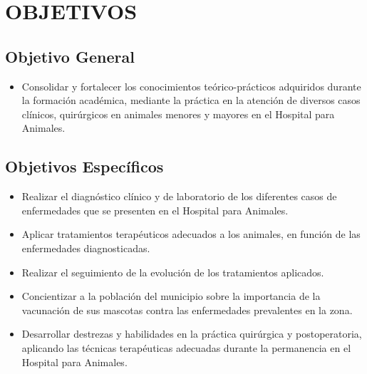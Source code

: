 \clearpage

\section{OBJETIVOS}
	\subsection{Objetivo General}
		\begin{itemize}
			\item Consolidar y fortalecer los conocimientos teórico-prácticos adquiridos durante la formación académica, mediante la práctica en la atención de diversos casos clínicos, quirúrgicos en animales menores y mayores en el Hospital para Animales.
		\end{itemize}
	\subsection{Objetivos Específicos}
		\begin{itemize}
			\item Realizar el diagnóstico clínico y de laboratorio de los diferentes casos de enfermedades que se presenten en el Hospital para Animales.
			\item Aplicar tratamientos terapéuticos adecuados a los animales, en función de las enfermedades diagnosticadas.
			\item Realizar el seguimiento de la evolución de los tratamientos aplicados.
			\item Concientizar a la población del municipio sobre la importancia de la vacunación de sus mascotas contra las enfermedades prevalentes en la zona.
			\item Desarrollar destrezas y habilidades en la práctica quirúrgica y postoperatoria, aplicando las técnicas terapéuticas adecuadas durante la permanencia en el Hospital para Animales.
		\end{itemize}
